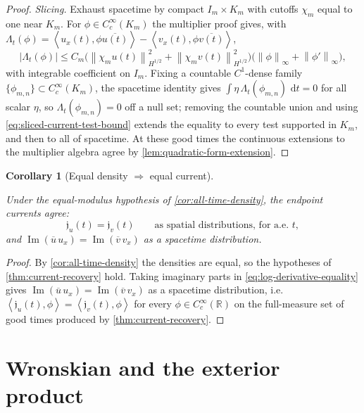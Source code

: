 \documentclass[11pt,oneside]{book}
\providecommand{\uses}[1]{}
\newtheorem{corollary}[theorem]{Corollary}
\theoremstyle{definition}
\theoremstyle{remark}
\newcommand{\R}{\mathbb R}
\newcommand{\1}{\mathbf 1}
\newcommand{\Ima}{\operatorname{Im}}
\newcommand{\dd}{\,\mathrm d}
\newcommand{\norm}[1]{\left\lVert #1\right\rVert}
\newcommand{\pair}[2]{\left\langle #1,#2\right\rangle}
\begin{document}
\begin{proof}
\emph{Slicing.} Exhaust spacetime by compact $I_m\times K_m$ with cutoffs
$\chi_m$ equal to one near $K_m$. For $\phi\in C_c^\infty(K_m)$ the multiplier
proof gives, with
$\Lambda_t(\phi)=\pair{u_x(t)}{\phi\overline{u(t)}}
 -\pair{v_x(t)}{\phi\overline{v(t)}}$,
\begin{equation}
 |\Lambda_t(\phi)|
 \le C_m\bigl(\norm{\chi_m u(t)}_{H^{1/2}}^2
              +\norm{\chi_m v(t)}_{H^{1/2}}^2\bigr)
       \bigl(\norm\phi_\infty+\norm{\phi'}_\infty\bigr),
 \label{eq:sliced-current-test-bound}
\end{equation}
with integrable coefficient on $I_m$. Fixing a countable $C^1$-dense family
$\{\phi_{m,n}\}\subset C_c^\infty(K_m)$, the spacetime identity gives
$\int\eta\,\Lambda_t(\phi_{m,n})\,\dd t=0$ for all scalar $\eta$, so
$\Lambda_t(\phi_{m,n})=0$ off a null set; removing the countable union and
using \eqref{eq:sliced-current-test-bound} extends the equality to every test
supported in $K_m$, and then to all of spacetime. At these good times the
continuous extensions to the multiplier algebra agree by
\cref{lem:quadratic-form-extension}.
\end{proof}

\begin{corollary}[Equal density $\Rightarrow$ equal current]\label{cor:density-equal-current}
\uses{def:endpoint-current}
Under the equal-modulus hypothesis of \cref{cor:all-time-density}, the endpoint
currents agree:
\[
 \mathfrak j_u(t)=\mathfrak j_v(t)
 \qquad\text{as spatial distributions, for a.e.\ }t,
\]
and $\Ima(\overline u\,u_x)=\Ima(\overline v\,v_x)$ as a spacetime
distribution.
\end{corollary}

\begin{proof}
\uses{thm:current-recovery, cor:all-time-density}
By \cref{cor:all-time-density} the densities are equal, so the hypotheses of
\cref{thm:current-recovery} hold. Taking imaginary parts in
\eqref{eq:log-derivative-equality} gives
$\Ima(\overline u\,u_x)=\Ima(\overline v\,v_x)$ as a spacetime distribution,
i.e.\ $\pair{\mathfrak j_u(t)}{\phi}=\pair{\mathfrak j_v(t)}{\phi}$ for every
$\phi\in C_c^\infty(\R)$ on the full-measure set of good times produced by
\cref{thm:current-recovery}.
\end{proof}


\chapter{Wronskian and the exterior product}\label{chap:wronskian-exterior}
\end{document}

